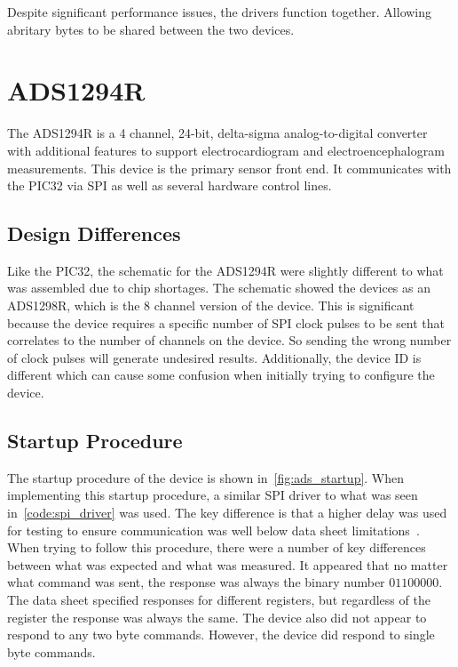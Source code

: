 Despite significant performance issues, the drivers function together.
Allowing abritary bytes to be shared between the two devices.


\section{ADS1294R}
The ADS1294R is a 4 channel, 24-bit, delta-sigma analog-to-digital converter with additional features to support electrocardiogram and electroencephalogram measurements.
This device is the primary sensor front end.
It communicates with the PIC32 via SPI as well as several hardware control lines.

\subsection{Design Differences}
Like the PIC32, the schematic for the ADS1294R were slightly different to what was assembled due to chip shortages.
The schematic showed the devices as an ADS1298R, which is the 8 channel version of the device.
This is significant because the device requires a specific number of SPI clock pulses to be sent that correlates to the number of channels on the device.
So sending the wrong number of clock pulses will generate undesired results.
Additionally, the device ID is different which can cause some confusion when initially trying to configure the device.

\subsection{Startup Procedure}
The startup procedure of the device is shown in~\autoref{fig:ads_startup}.
When implementing this startup procedure, a similar SPI driver to what was seen in~\autoref{code:spi_driver} was used.
The key difference is that a higher delay was used for testing to ensure communication was well below data sheet limitations~\cite{ADS}.
When trying to follow this procedure, there were a number of key differences between what was expected and what was measured.
It appeared that no matter what command was sent, the response was always the binary number \(01100000\).
The data sheet specified responses for different registers, but regardless of the register the response was always the same.
The device also did not appear to respond to any two byte commands.
However, the device did respond to single byte commands.

